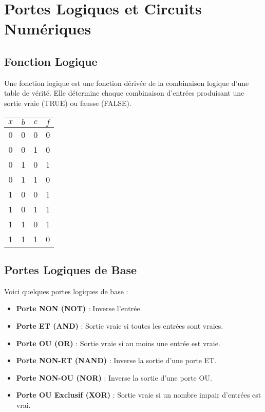 \documentclass[10pt,a4paper]{article}
\begin{document}

\section*{Portes Logiques et Circuits Numériques}

\subsection*{Fonction Logique}

Une fonction logique est une fonction dérivée de la combinaison logique d'une table de vérité. Elle détermine chaque combinaison d'entrées produisant une sortie vraie (TRUE) ou fausse (FALSE).

\begin{center}
    \begin{tabular}{|c|c|c|c|}
    \hline
    \( x \) & \( b \) & \( c \) & \( f \) \\
    \hline
    0 & 0 & 0 & 0 \\
    0 & 0 & 1 & 0 \\
    0 & 1 & 0 & 1 \\
    0 & 1 & 1 & 0 \\
    1 & 0 & 0 & 1 \\
    1 & 0 & 1 & 1 \\
    1 & 1 & 0 & 1 \\
    1 & 1 & 1 & 0 \\
    \hline
    \end{tabular}
\end{center}


\subsection*{Portes Logiques de Base}

Voici quelques portes logiques de base :

\begin{itemize}
    \item \textbf{Porte NON (NOT)} : Inverse l'entrée.
    \item \textbf{Porte ET (AND)} : Sortie vraie si toutes les entrées sont vraies.
    \item \textbf{Porte OU (OR)} : Sortie vraie si au moins une entrée est vraie.
    \item \textbf{Porte NON-ET (NAND)} : Inverse la sortie d'une porte ET.
    \item \textbf{Porte NON-OU (NOR)} : Inverse la sortie d'une porte OU.
    \item \textbf{Porte OU Exclusif (XOR)} : Sortie vraie si un nombre impair d'entrées est vrai.
\end{itemize}
\end{document}
